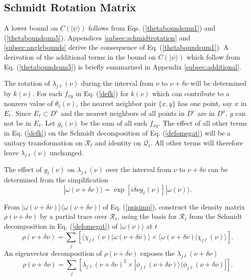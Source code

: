 \documentclass[12pt,amsmath,amssymb,onecolumn]{revtex4-2}
\begin{document}
\subsection{\label{subsec:schmidtrotation} Schmidt Rotation Matrix}

A lower bound on $C(|\psi \rangle )$  follows from Eqs. (\ref{thetaboundsum1}) and (\ref{thetaboundsum5}). 
Appendices \ref{subsec:schmidtrotation}
and \ref{subsec:anglebounds} derive the consequence of Eq. (\ref{thetaboundsum1}).
A derivation of the additional terms in the bound on $C(|\psi \rangle )$
which follow
from Eq. (\ref{thetaboundsum5}) is briefly summarized in Appendix \ref{subsec:additional}.

The rotation of $\lambda_{j\ell} (\nu)$ during the interval from $\nu$ to $\nu + \delta \nu$
will be determined by $k(\nu)$. For each $f_{xy}$ in Eq. (\ref{defk}) for $k(\nu)$ which can contribute to 
a nonzero value of $\theta_{\ell}(\nu)$, the nearest neighbor pair $\{x, y\}$ has one point, say $x$ in $E_{\ell}$.
Since $E_{\ell} \subset D^e$ and the nearest neighbors of all points in $D^e$ are in
$D^o$, $y$ can not be in $E_\ell$. Let $g_{\ell}(\nu)$ be the sum of all such $f_{xy}$.
The effect of all other terms in Eq. (\ref{defk}) on the
Schmidt decomposition of Eq. (\ref{defomegat}) will be
a unitary transformation on $\mathcal{R}_\ell$ and identity on $\mathcal{Q}_\ell$.
All other terms will therefore leave $\lambda_{j\ell}( \nu)$ unchanged.

The effect of $g_{\ell}(\nu)$ on $\lambda_{j\ell}(\nu)$ over the
interval from $\nu$ to $\nu + \delta \nu$ can be determined from the simplification
\begin{equation}
\label{psisimp}
|\omega(\nu + \delta \nu) \rangle  = \exp[ i \delta \nu g_{\ell}(\nu)] |\omega(\nu) \rangle .
\end{equation}

From $|\omega(\nu + \delta \nu) \rangle  \langle \omega(\nu + \delta \nu)|$ of Eq. (\ref{psisimp}),
construct the density matrix $\rho(\nu + \delta \nu)$ by 
a partial trace over $\mathcal{R}_{\ell}$, 
using the basis for $\mathcal{R}_{\ell}$
from the Schmidt decomposition in Eq. (\ref{defomegat}) of $|\omega(\nu) \rangle $ at $t$
\begin{equation}
\label{defrho}
\rho(\nu + \delta \nu) = 
\sum_j [ \langle  \chi_{j\ell}(\nu)|\omega(\nu + \delta \nu) \rangle  \times \langle \omega(\nu + \delta \nu)|\chi_{j\ell}(\nu) \rangle ].
\end{equation} 
An eigenvector decomposition of $\rho(\nu + \delta \nu)$ exposes
the $\lambda_{j\ell}(\nu + \delta \nu)$
\begin{equation}
\label{rhodeltat}
\rho(\nu + \delta \nu) = 
\sum_j [\lambda_{j\ell}( \nu + \delta \nu)^2 \times
 |\phi_{j\ell}(\nu + \delta \nu) \rangle  \langle \phi_{j\ell}( \nu + \delta \nu)|].
\end{equation}
\end{document}
